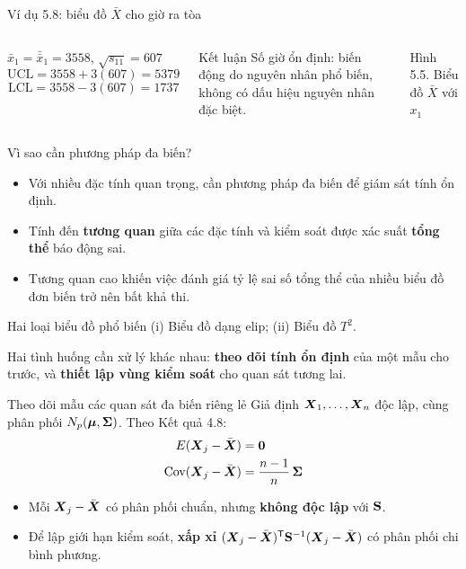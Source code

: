 \begin{frame}{Ví dụ 5.8: biểu đồ \(\bar{X}\) cho giờ ra tòa}
  \begin{columns}[T]
    \small
    \(\bar{x}_1=\bar{\bar{x}}_1=3558\), \(\sqrt{s_{11}}=607\)
    \begin{equation*}
      \mathrm{UCL}=3558+3(607)=5379
    \end{equation*}
    \begin{equation*}
      \mathrm{LCL}=3558-3(607)=1737
    \end{equation*}
    \begin{block}{Kết luận}
      Số giờ ổn định: biến động do nguyên nhân phổ biến, không có dấu hiệu nguyên nhân đặc biệt.
    \end{block}
    \centering
    \resizebox{\linewidth}{!}{}

    {\scriptsize Hình 5.5. Biểu đồ \(\bar{X}\) với \(x_1\)}
  \end{columns}
\end{frame}

\begin{frame}{Vì sao cần phương pháp đa biến?}
  \begin{itemize}
    \item Với nhiều đặc tính quan trọng, cần phương pháp đa biến để giám sát tính ổn định.
    \item Tính đến \textbf{tương quan} giữa các đặc tính và kiểm soát được xác suất \textbf{tổng thể} báo động sai.
    \item Tương quan cao khiến việc đánh giá tỷ lệ sai số tổng thể của nhiều biểu đồ đơn biến trở nên bất khả thi.
  \end{itemize}
  \begin{block}{Hai loại biểu đồ phổ biến}
    (i) Biểu đồ dạng elip; \quad (ii) Biểu đồ \(T^2\).
  \end{block}
  Hai tình huống cần xử lý khác nhau: \textbf{theo dõi tính ổn định} của một mẫu cho trước, và \textbf{thiết lập vùng kiểm soát} cho quan sát tương lai.
\end{frame}

\begin{frame}{Theo dõi mẫu các quan sát đa biến riêng lẻ}
  Giả định \(\boldsymbol{X}_1,\dots,\boldsymbol{X}_n\) độc lập, cùng phân phối \(N_p(\boldsymbol{\mu},\boldsymbol{\Sigma})\). Theo Kết quả 4.8:
  \begin{align*}
    E(\boldsymbol{X}_j-\bar{\boldsymbol{X}})&=\boldsymbol{0}\\
    \operatorname{Cov}(\boldsymbol{X}_j-\bar{\boldsymbol{X}})&=\frac{n-1}{n}\,\boldsymbol{\Sigma}
  \end{align*}
  \begin{itemize}
    \item Mỗi \(\boldsymbol{X}_j-\bar{\boldsymbol{X}}\) có phân phối chuẩn, nhưng \textbf{không độc lập} với \(\mathbf{S}\).
    \item Để lập giới hạn kiểm soát, \textbf{xấp xỉ} \((\boldsymbol{X}_j-\bar{\boldsymbol{X}})^{\mathsf T}\mathbf{S}^{-1}(\boldsymbol{X}_j-\bar{\boldsymbol{X}})\) có phân phối chi bình phương.
  \end{itemize}
\end{frame}

